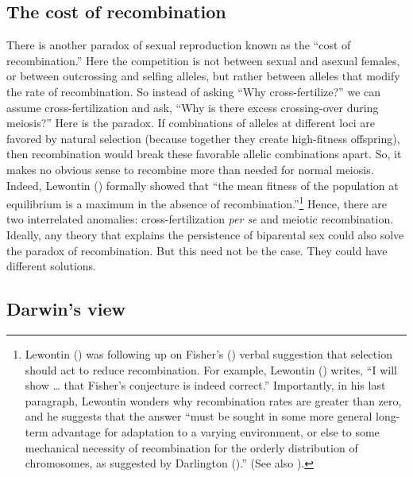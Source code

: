 \documentclass[
  letterpaper,
]{book}
\begin{document}
\subsection{The cost of recombination}\label{the-cost-of-recombination}

There is another paradox of sexual reproduction known as the ``cost of
recombination.'' Here the competition is not between sexual and asexual
females, or between outcrossing and selfing alleles, but rather between
alleles that modify the rate of recombination. So instead of asking
``Why cross-fertilize?'' we can assume cross-fertilization and ask,
``Why is there excess crossing-over during meiosis?'' Here is the
paradox. If combinations of alleles at different loci are favored by
natural selection (because together they create high-fitness offspring),
then recombination would break these favorable allelic combinations
apart. So, it makes no obvious sense to recombine more than needed for
normal meiosis. Indeed, Lewontin ()
formally showed that ``the mean fitness of the population at equilibrium
is a maximum in the absence of recombination.''\footnote{Lewontin
  () was following up on Fisher's
  () verbal suggestion that selection
  should act to reduce recombination. For example, Lewontin
  () writes, ``I will show \ldots{}
  that Fisher's conjecture is indeed correct.'' Importantly, in his last
  paragraph, Lewontin wonders why recombination rates are greater than
  zero, and he suggests that the answer ``must be sought in some more
  general long-term advantage for adaptation to a varying environment,
  or else to some mechanical necessity of recombination for the orderly
  distribution of chromosomes, as suggested by Darlington
  ().'' (See also
  ).} Hence, there are two
interrelated anomalies: cross-fertilization \emph{per se} and meiotic
recombination. Ideally, any theory that explains the persistence of
biparental sex could also solve the paradox of recombination. But this
need not be the case. They could have different solutions.

\subsection{Darwin's view}\label{darwins-view}
\end{document}
